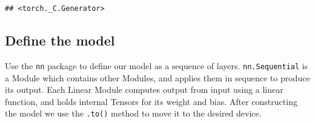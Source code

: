 \documentclass[]{book}
\newenvironment{Shaded}{\begin{snugshade}}{\end{snugshade}}
\newcommand{\CommentTok}[1]{\textcolor[rgb]{0.56,0.35,0.01}{\textit{#1}}}
\newcommand{\DataTypeTok}[1]{\textcolor[rgb]{0.13,0.29,0.53}{#1}}
\newcommand{\DecValTok}[1]{\textcolor[rgb]{0.00,0.00,0.81}{#1}}
\newcommand{\KeywordTok}[1]{\textcolor[rgb]{0.13,0.29,0.53}{\textbf{#1}}}
\newcommand{\NormalTok}[1]{#1}
\newcommand{\OperatorTok}[1]{\textcolor[rgb]{0.81,0.36,0.00}{\textbf{#1}}}
\newcommand{\StringTok}[1]{\textcolor[rgb]{0.31,0.60,0.02}{#1}}
\begin{document}
\begin{Shaded}
\end{Shaded}

\begin{verbatim}
## <torch._C.Generator>
\end{verbatim}

\begin{Shaded}
\end{Shaded}

\hypertarget{define-the-model-1}{%
\subsection{Define the model}\label{define-the-model-1}}

Use the \texttt{nn} package to define our model as a sequence of layers. \texttt{nn.Sequential}
is a Module which contains other Modules, and applies them in sequence to
produce its output. Each Linear Module computes output from input using a
linear function, and holds internal Tensors for its weight and bias.
After constructing the model we use the \texttt{.to()} method to move it to the
desired device.

\begin{Shaded}
\end{Shaded}
\end{document}
